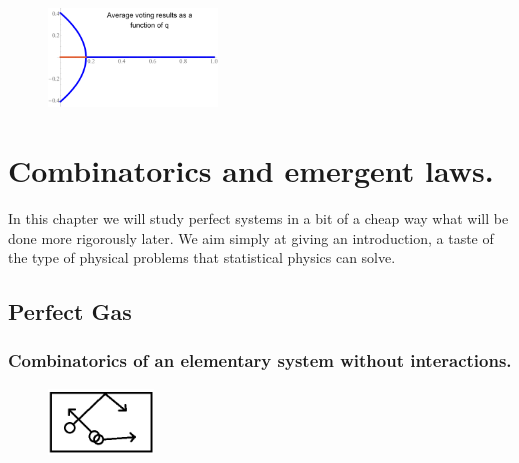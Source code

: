 \documentclass[10pt,a4paper]{book}
\begin{document}
\begin{figure}[h]
  \begin{center}
    \includegraphics[width=0.4\textwidth]{graphs/voting_result}
  \end{center}
\end{figure}


\chapter{Combinatorics and emergent laws.}

In this chapter we will study perfect systems in a bit of a cheap way what will be done more rigorously later. We aim simply at giving an introduction, a taste of the type of physical problems that statistical physics can solve.

\section{Perfect Gas}
\subsection{Combinatorics of an elementary system without interactions.}
\begin{figure}
    \includegraphics[width=0.25\textwidth]{graphs/GasNoCol}
\end{figure}
\end{document}
